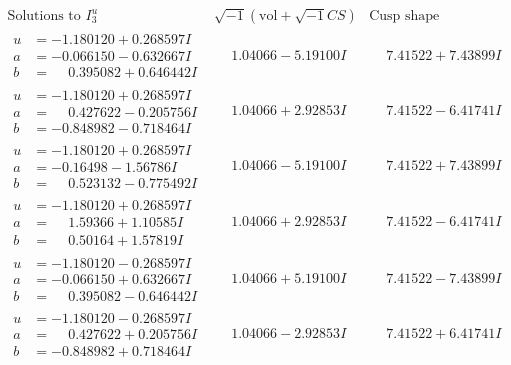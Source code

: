 \documentclass[1p]{elsarticle_modified}
\theoremstyle{definition}
\newcommand{\I}{\sqrt{-1}}
\begin{document}
$$\begin{array}{c|c|c}  
\text{Solutions to }I^u_{3}& \I (\text{vol} + \sqrt{-1}CS) & \text{Cusp shape}\\
 \hline 
\begin{aligned}
u &= -1.180120 + 0.268597 I \\
a &= -0.066150 - 0.632667 I \\
b &= \phantom{-}0.395082 + 0.646442 I\end{aligned}
 & \phantom{-}1.04066 - 5.19100 I & \phantom{-}7.41522 + 7.43899 I \\ \hline\begin{aligned}
u &= -1.180120 + 0.268597 I \\
a &= \phantom{-}0.427622 - 0.205756 I \\
b &= -0.848982 - 0.718464 I\end{aligned}
 & \phantom{-}1.04066 + 2.92853 I & \phantom{-}7.41522 - 6.41741 I \\ \hline\begin{aligned}
u &= -1.180120 + 0.268597 I \\
a &= -0.16498 - 1.56786 I \\
b &= \phantom{-}0.523132 - 0.775492 I\end{aligned}
 & \phantom{-}1.04066 - 5.19100 I & \phantom{-}7.41522 + 7.43899 I \\ \hline\begin{aligned}
u &= -1.180120 + 0.268597 I \\
a &= \phantom{-}1.59366 + 1.10585 I \\
b &= \phantom{-}0.50164 + 1.57819 I\end{aligned}
 & \phantom{-}1.04066 + 2.92853 I & \phantom{-}7.41522 - 6.41741 I \\ \hline\begin{aligned}
u &= -1.180120 - 0.268597 I \\
a &= -0.066150 + 0.632667 I \\
b &= \phantom{-}0.395082 - 0.646442 I\end{aligned}
 & \phantom{-}1.04066 + 5.19100 I & \phantom{-}7.41522 - 7.43899 I \\ \hline\begin{aligned}
u &= -1.180120 - 0.268597 I \\
a &= \phantom{-}0.427622 + 0.205756 I \\
b &= -0.848982 + 0.718464 I\end{aligned}
 & \phantom{-}1.04066 - 2.92853 I & \phantom{-}7.41522 + 6.41741 I \\ \hline\begin{aligned}

\end{aligned}
\end{array}$$
\end{document}

